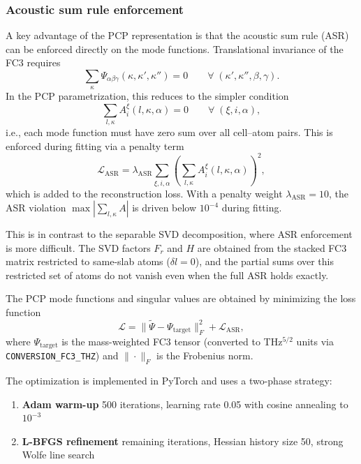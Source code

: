 \subsubsection{Acoustic sum rule enforcement}
\label{sssub:pcp_asr}

A key advantage of the PCP representation is that the acoustic sum rule
(ASR) can be enforced directly on the mode functions.  Translational
invariance of the FC3 requires
\begin{equation}
  \sum_{\kappa} \Psi_{\alpha\beta\gamma}(\kappa, \kappa', \kappa'') = 0
  \qquad \forall\;(\kappa',\kappa'',\beta,\gamma).
\end{equation}
In the PCP parametrization, this reduces to the simpler condition
\begin{equation}\label{eq:pcp_asr}
  \sum_{l,\kappa} A_i^{\xi}(l, \kappa, \alpha) = 0
  \qquad \forall\;(\xi, i, \alpha),
\end{equation}
i.e., each mode function must have zero sum over all cell--atom pairs.
This is enforced during fitting via a penalty term
\begin{equation}
  \mathcal{L}_\mathrm{ASR}
  = \lambda_\mathrm{ASR}
    \sum_{\xi,i,\alpha}
    \left(
      \sum_{l,\kappa} A_i^{\xi}(l, \kappa, \alpha)
    \right)^{\!2},
\end{equation}
which is added to the reconstruction loss.  With a penalty weight
$\lambda_\mathrm{ASR} = 10$, the ASR violation
$\max|\sum_{l,\kappa} A|$ is driven below $10^{-4}$ during fitting.

This is in contrast to the separable SVD decomposition, where ASR
enforcement is more difficult.  The SVD factors $F_r$ and $H$ are
obtained from the stacked FC3 matrix restricted to same-slab atoms
($\delta l = 0$), and the partial sums over this restricted set of
atoms do not vanish even when the full ASR holds exactly.

The PCP mode functions and singular values are obtained by minimizing
the loss function
\begin{equation}\label{eq:pcp_loss}
  \mathcal{L}
  = \bigl\|\tilde{\Psi} - \Psi_\mathrm{target}\bigr\|_F^2
    + \mathcal{L}_\mathrm{ASR},
\end{equation}
where $\Psi_\mathrm{target}$ is the mass-weighted FC3 tensor (converted
to THz$^{5/2}$ units via \texttt{CONVERSION\_FC3\_THZ}) and
$\|\cdot\|_F$ is the Frobenius norm.

The optimization is implemented in PyTorch and uses a two-phase
strategy:
\begin{enumerate}
  \item \textbf{Adam warm-up} 500 iterations, learning
        rate 0.05 with cosine annealing to $10^{-3}$

  \item \textbf{L-BFGS refinement} remaining iterations,
        Hessian history size 50, strong Wolfe line search
\end{enumerate}


